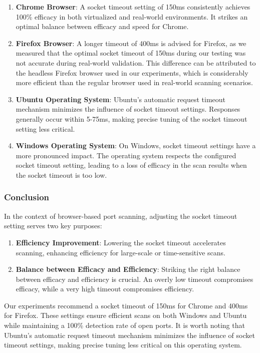 \begin{enumerate}
    \item \textbf{Chrome Browser}: A socket timeout setting of 150ms consistently achieves 100\% efficacy in both virtualized and real-world environments. It strikes an optimal balance between efficacy and speed for Chrome.
    \item \textbf{Firefox Browser}: A longer timeout of 400ms is advised for Firefox, as we measured that the optimal socket timeout of 150ms during our testing was not accurate during real-world validation. This difference can be attributed to the headless Firefox browser used in our experiments, which is considerably more efficient than the regular browser used in real-world scanning scenarios.
    \item \textbf{Ubuntu Operating System}: Ubuntu's automatic request timeout mechanism minimizes the influence of socket timeout settings. Responses generally occur within 5-75ms, making precise tuning of the socket timeout setting less critical. 
    \item \textbf{Windows Operating System}: On Windows, socket timeout settings have a more pronounced impact. The operating system respects the configured socket timeout setting, leading to a loss of efficacy in the scan results when the socket timeout is too low. 
\end{enumerate}

\subsubsection{Conclusion}

In the context of browser-based port scanning, adjusting the socket timeout setting serves two key purposes:

\begin{enumerate}
    \item \textbf{Efficiency Improvement}: Lowering the socket timeout accelerates scanning, enhancing efficiency for large-scale or time-sensitive scans.
    \item \textbf{Balance between Efficacy and Efficiency}: Striking the right balance between efficacy and efficiency is crucial. An overly low timeout compromises efficacy, while a very high timeout compromises efficiency.
\end{enumerate}

Our experiments recommend a socket timeout of 150ms for Chrome and 400ms for Firefox. These settings ensure efficient scans on both Windows and Ubuntu while maintaining a 100\% detection rate of open ports. It is worth noting that Ubuntu's automatic request timeout mechanism minimizes the influence of socket timeout settings, making precise tuning less critical on this operating system.

